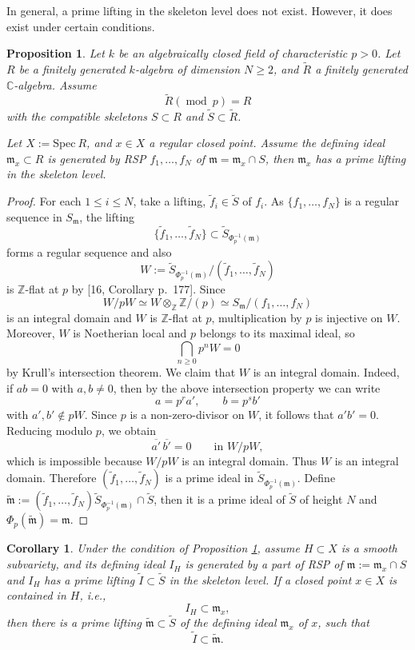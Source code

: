 \documentclass[a4paper]{amsart}
\def\CC{{\mathbb{C}}}
\newcommand{\spec}{{\mathrm{Spec \ }}}
\newcommand{\wI}{{\widetilde{I}}}
\newcommand{\m}{{\mathfrak{m}}}
\renewcommand{\wr}{{\widetilde R}}
\newcommand{\tf}{{\tilde f}}
\newcommand{\ws}{{\widetilde{S}}}
\newcommand{\wm}{{\widetilde\m}}
\renewcommand{\mod}{{\operatorname{mod}\ }}
\newtheorem{cor}[thm]{Corollary}
\newtheorem{prop}[thm]{Proposition}
\theoremstyle{definition}
\begin{document}

In general, a prime lifting in the skeleton level does not exist.
However, it does exist under certain conditions.


\begin{prop}\label{lift-of-maximal-ideal}
Let $k$ be an algebraically closed field of characteristic $p>0$.
      Let $R$ be a finitely generated $k$-algebra of dimension $N\geq2$, and 
      $\wr$ a finitely generated $\CC$-algebra.
        Assume 
        $$\wr (\mod p)=R$$
         with the compatible skeletons $S\subset R$ and $\ws\subset \wr$.
         
   Let $X:=\spec R$,  and $x\in X$ a regular closed point.
   Assume 
   the defining ideal $\m_x\subset R$ is generated by RSP $f_1,\ldots,f_N $ of $\m=\m_x\cap S$,
   then $\m_x$
   has a prime lifting in the skeleton level.
\end{prop}
\begin{proof} For each $1\leq i\leq N$, take a lifting, $\tf_i\in \ws$ of $f_i$.
     As $\{f_1,\ldots,f_N \}$ is a regular sequence in $S_\m$, the lifting 
     $$\{\tf_1,\ldots, \tf_N\}\subset \ws_{\Phi_p^{-1}(\m)}$$
     forms a regular sequence and also
   \[
W:=\widetilde{S}_{\Phi_p^{-1}(\mathfrak m)}/(\widetilde f_1,\dots,\widetilde f_N)
\]
is $\mathbb Z$-flat at $p$ by [16, Corollary p.~177]. Since
\[
W/pW \simeq W\otimes_{\mathbb Z}\mathbb Z/(p)
 \simeq S_{\mathfrak m}/(f_1,\dots,f_N)
\]
is an integral domain and $W$ is $\mathbb Z$-flat at $p$, multiplication by $p$
is injective on $W$. Moreover, $W$ is Noetherian local and $p$ belongs to its
maximal ideal, so
\[
\bigcap_{n\ge 0} p^nW = 0
\]
by Krull's intersection theorem. We claim that $W$ is an integral domain.
Indeed, if $ab=0$ with $a,b\neq 0$, then by the above intersection property we
can write
\[
a=p^r a', \qquad b=p^s b'
\]
with $a',b'\notin pW$. Since $p$ is a non-zero-divisor on $W$, it follows that
$a'b'=0$. Reducing modulo $p$, we obtain
\[
\overline{a'}\,\overline{b'}=0 \qquad \text{in } W/pW,
\]
which is impossible because $W/pW$ is an integral domain. Thus $W$ is an
integral domain. Therefore $(\widetilde f_1,\dots,\widetilde f_N)$ is a prime
ideal in $\widetilde{S}_{\Phi_p^{-1}(\mathfrak m)}$.
     Define $\wm:=(\tf_1,\ldots, \tf_N)\ws_{\Phi_p^{-1}(\m)}\cap \ws$,
     then it is a prime ideal of $\ws$ of height $N$ and $\Phi_p(\wm)=\m$.
\end{proof}


\begin{cor}\label{inclusions}
    Under the condition of Proposition \ref{lift-of-maximal-ideal}, assume $H\subset X$ is a smooth 
    subvariety, and its defining ideal  $I_H$ is generated by a part of RSP of $\m:=\m_x\cap S$ 
    and $I_H$ has a prime lifting $\wI\subset \ws$ in the skeleton level.
    If a closed point $x\in X$ is contained in $H$, {\it i.e.,}
 $$I_H\subset \m_x,$$   
    then there is a prime lifting $\wm\subset \ws$ of the 
   defining  ideal $\m_x$ of $x$, such that $$\wI\subset \wm.$$ 
\end{cor}
\end{document}
